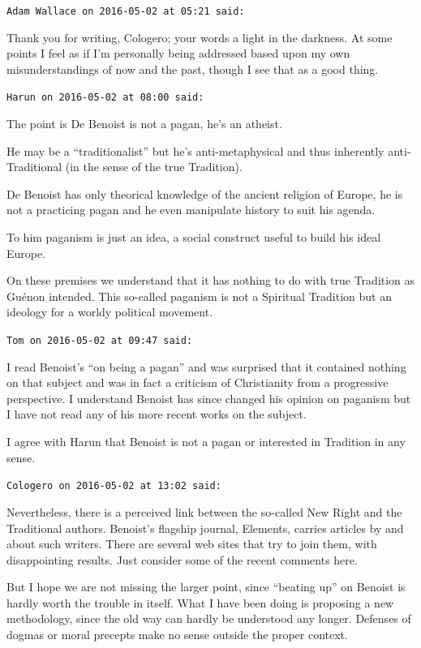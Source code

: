 \begin{footnotesize}
\begin{sffamily}
\texttt{Adam Wallace on 2016-05-02 at 05:21 said:}

Thank you for writing, Cologero; your words a light in the darkness. At some points I feel as if I'm personally being addressed based upon my own misunderstandings of now and the past, though I see that as a good thing.

\hfill

\texttt{Harun on 2016-05-02 at 08:00 said:}

The point is De Benoist is not a pagan, he's an atheist.

He may be a ``traditionalist'' but he's anti-metaphysical and thus inherently anti-Traditional (in the sense of the true Tradition).

De Benoist has only theorical knowledge of the ancient religion of Europe, he is not a practicing pagan and he even manipulate history to suit his agenda.

To him paganism is just an idea, a social construct useful to build his ideal Europe.

On these premises we understand that it has nothing to do with true Tradition as Guénon intended. This so-called paganism is not a Spiritual Tradition but an ideology for a worldy political movement.

\hfill

\texttt{Tom on 2016-05-02 at 09:47 said:}

I read Benoist's ``on being a pagan'' and was surprised that it contained nothing on that subject and was in fact a criticism of Christianity from a progressive perspective. I understand Benoist has since changed his opinion on paganism but I have not read any of his more recent works on the subject.

I agree with Harun that Benoist is not a pagan or interested in Tradition in any sense.

\hfill

\texttt{Cologero on 2016-05-02 at 13:02 said:}

Nevertheless, there is a perceived link between the so-called New Right and the Traditional authors. Benoist's flagship journal, Elements, carries articles by and about such writers. There are several web sites that try to join them, with disappointing results. Just consider some of the recent comments here.

But I hope we are not missing the larger point, since ``beating up'' on Benoist is hardly worth the trouble in itself. What I have been doing is proposing a new methodology, since the old way can hardly be understood any longer. Defenses of dogmas or moral precepts make no sense outside the proper context.


\end{sffamily}
\end{footnotesize}
